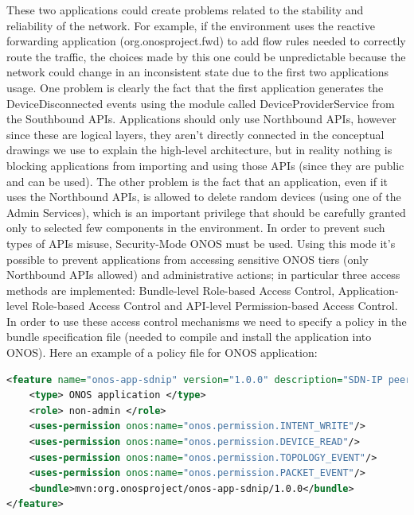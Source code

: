 These two applications could create problems related to the stability and reliability of the network. For example, if the environment uses the reactive forwarding application (org.onosproject.fwd) to add flow rules needed to correctly route the traffic, the choices made by this one could be unpredictable because the network could change in an inconsistent state due to the first two applications usage. One problem is clearly the fact that the first application generates the DeviceDisconnected events using the module called DeviceProviderService from the Southbound APIs. Applications should only use Northbound APIs, however since these are logical layers, they aren't directly connected in the conceptual drawings we use to explain the high-level architecture, but in reality nothing is blocking applications from importing and using those APIs (since they are public and can be used). The other problem is the fact that an application, even if it uses the Northbound APIs, is allowed to delete random devices (using one of the Admin Services), which is an important privilege that should be carefully granted only to selected few components in the environment. In order to prevent such types of APIs misuse, Security-Mode ONOS must be used. Using this mode it's possible to prevent applications from accessing sensitive ONOS tiers (only Northbound APIs allowed) and administrative actions; in particular three access methods are implemented: Bundle-level Role-based Access Control, Application-level Role-based Access Control and API-level Permission-based Access Control.
In order to use these access control mechanisms we need to specify a policy in the bundle specification file (needed to compile and install the application into ONOS). Here an example of a policy file for ONOS application:
\begin{lstlisting}[language=XML]
<feature name="onos-app-sdnip" version="1.0.0" description="SDN-IP peering application">
	<type> ONOS application </type>
	<role> non-admin </role>
	<uses-permission onos:name="onos.permission.INTENT_WRITE"/>
	<uses-permission onos:name="onos.permission.DEVICE_READ"/>
	<uses-permission onos:name="onos.permission.TOPOLOGY_EVENT"/>
	<uses-permission onos:name="onos.permission.PACKET_EVENT"/>
	<bundle>mvn:org.onosproject/onos-app-sdnip/1.0.0</bundle>
</feature>
\end{lstlisting}
